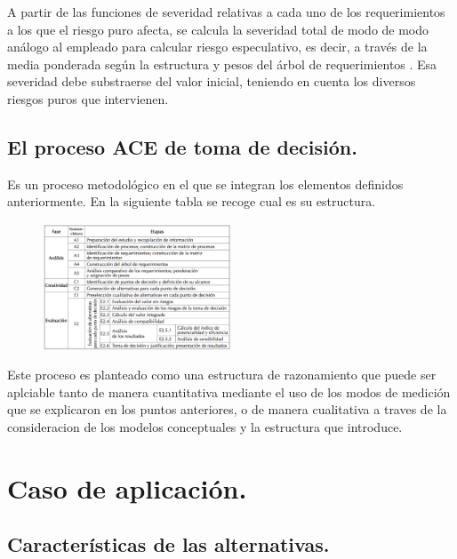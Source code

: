 \documentclass[10pt]{article}
\begin{document}
	
	A partir de las funciones de severidad relativas a cada uno de los requerimientos a los que el riesgo puro afecta, se calcula la severidad total de modo de modo análogo al empleado para calcular riesgo especulativo, es decir, a través de la media ponderada según la estructura y pesos del árbol de requerimientos . Esa severidad debe substraerse del valor inicial, teniendo en cuenta los diversos riesgos puros que intervienen.\\


\subsection{El proceso ACE de toma de decisión.}

Es un proceso metodológico en el que se integran los elementos definidos anteriormente. En la siguiente tabla se recoge cual es su estructura.

\begin{figure}[H]
	\begin{center}
 		\includegraphics[width = 0.5\textwidth]{Imagenes/tabla1.eps}
	\end{center} 
\end{figure}

Este proceso es planteado como una estructura de razonamiento que puede ser aplciable tanto de manera cuantitativa mediante el uso de los modos de medición que se explicaron en los puntos anteriores, o de manera cualitativa a traves de la consideracion de los modelos conceptuales y la estructura que introduce.


\section{Caso de aplicación.}


\subsection{Características de las alternativas.}
\end{document}
